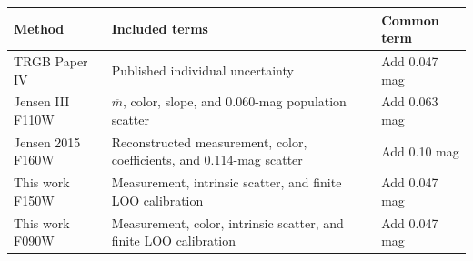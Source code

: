 \begin{tabular}{lp{7.4cm}p{3.2cm}}
\toprule
Method & Included terms & Common term \\
\midrule
TRGB Paper IV & Published individual uncertainty & Add 0.047 mag \\
Jensen III F110W & $\overline m$, color, slope, and 0.060-mag population scatter & Add 0.063 mag \\
Jensen 2015 F160W & Reconstructed measurement, color, coefficients, and 0.114-mag scatter & Add 0.10 mag \\
This work F150W & Measurement, intrinsic scatter, and finite LOO calibration & Add 0.047 mag \\
This work F090W & Measurement, color, intrinsic scatter, and finite LOO calibration & Add 0.047 mag \\
\bottomrule
\end{tabular}
